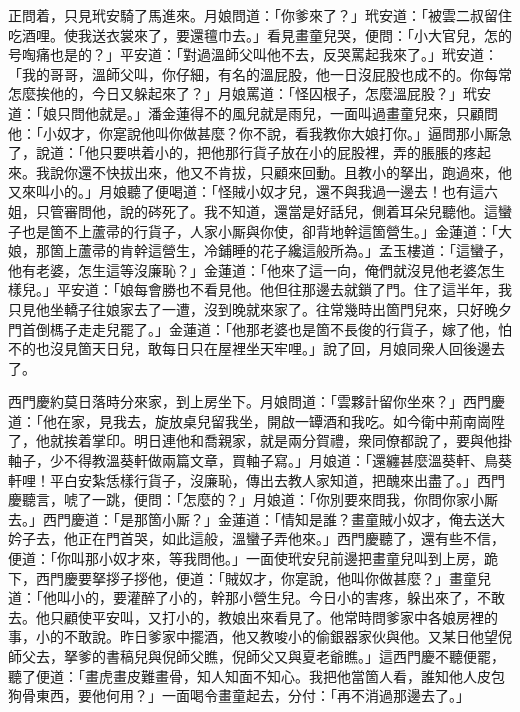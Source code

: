 正問着，只見玳安騎了馬進來。月娘問道：「你爹來了？」玳安道：「被雲二叔留住吃酒哩。使我送衣裳來了，要還氊巾去。」看見畫童兒哭，便問：「小大官兒，怎的号啕痛也是的？」平安道：「對過溫師父叫他不去，反哭罵起我來了。」玳安道：「我的哥哥，溫師父叫，你仔細，有名的溫屁股，他一日沒屁股也成不的。你每常怎麼挨他的，今日又躲起來了？」{}月娘罵道：「怪囚根子，怎麼溫屁股？」玳安道：「娘只問他就是。」潘金蓮得不的風兒就是雨兒，{}一面叫過畫童兒來，只顧問他：「小奴才，你寔說他叫你做甚麼？你不說，看我教你大娘打你。」逼問那小厮急了，說道：「他只要哄着小的，把他那行貨子放在小的屁股裡，弄的脹脹的疼起來。我說你還不快拔出來，他又不肯拔，只顧來回動。且教小的拏出，跑過來，他又來叫小的。」月娘聽了便喝道：「怪賊小奴才兒，還不與我過一邊去！也有這六姐，只管審問他，說的硶死了。我不知道，還當是好話兒，側着耳朵兒聽他。這蠻子也是箇不上蘆帚的行貨子，人家小厮與你使，卻背地幹這箇營生。」金蓮道：「大娘，那箇上蘆帚的肯幹這營生，{}冷鋪睡的花子纔這般所為。」{}孟玉樓道：「這蠻子，他有老婆，怎生這等沒廉恥？」金蓮道：「他來了這一向，俺們就沒見他老婆怎生樣兒。」平安道：「娘每會勝也不看見他。他但往那邊去就鎖了門。住了這半年，我只見他坐轎子往娘家去了一遭，沒到晚就來家了。往常幾時出箇門兒來，只好晚夕門首倒榪子走走兒罷了。」金蓮道：「他那老婆也是箇不長俊的行貨子，嫁了他，怕不的也沒見箇天日兒，敢每日只在屋裡坐天牢哩。」說了回，月娘同衆人回後邊去了。

西門慶約莫日落時分來家，到上房坐下。月娘問道：「雲夥計留你坐來？」西門慶道：「他在家，見我去，旋放桌兒留我坐，開啟一罈酒和我吃。如今衛中荊南崗陞了，他就挨着掌印。明日連他和喬親家，就是兩分賀禮，衆同僚都說了，要與他掛軸子，少不得教溫葵軒做兩篇文章，買軸子寫。」月娘道：「還纏甚麼溫葵軒、鳥葵軒哩！平白安紮恁樣行貨子，沒廉恥，傳出去教人家知道，把醜來出盡了。」西門慶聽言，唬了一跳，{}便問：「怎麼的？」月娘道：「你別要來問我，你問你家小厮去。」西門慶道：「是那箇小厮？」金蓮道：「情知是誰？畫童賊小奴才，俺去送大妗子去，他正在門首哭，如此這般，溫蠻子弄他來。」西門慶聽了，還有些不信，便道：「你叫那小奴才來，等我問他。」一面使玳安兒前邊把畫童兒叫到上房，跪下，西門慶要拏拶子拶他，{}便道：「賊奴才，你寔說，他叫你做甚麼？」畫童兒道：「他叫小的，要灌醉了小的，幹那小營生兒。{}今日小的害疼，躲出來了，不敢去。他只顧使平安叫，又打小的，教娘出來看見了。他常時問爹家中各娘房裡的事，小的不敢說。昨日爹家中擺酒，他又教唆小的偷銀器家伙與他。又某日他望倪師父去，拏爹的書稿兒與倪師父瞧，倪師父又與夏老爺瞧。」這西門慶不聽便罷，聽了便道：「畫虎畫皮難畫骨，知人知面不知心。我把他當箇人看，誰知他人皮包狗骨東西，要他何用？」{}一面喝令畫童起去，分付：「再不消過那邊去了。」

